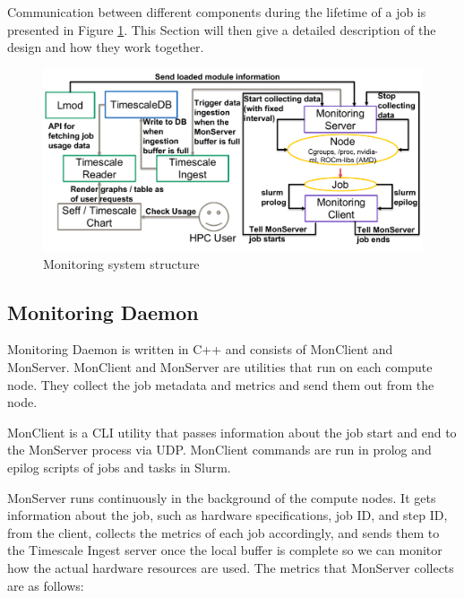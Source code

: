 
Communication between different components during the lifetime of a job is presented in Figure \ref{fig_monitoring}. This Section will then give a detailed description of the design and how they work together.

\begin{figure}[H]
    \centering
    \includegraphics[width=1\textwidth]{figures/monitoring.pdf}
    \caption{Monitoring system structure}
    \label{fig_monitoring}
\end{figure}

\subsection{Monitoring Daemon}

Monitoring Daemon is written in C++ and consists of MonClient and MonServer. MonClient and MonServer are utilities that run on each compute node. They collect the job metadata and metrics and send them out from the node.

MonClient is a CLI utility that passes information about the job start and end to the MonServer process via UDP. MonClient commands are run in prolog and epilog scripts of jobs and tasks in Slurm.

MonServer runs continuously in the background of the compute nodes. It gets information about the job, such as hardware specifications, job ID, and step ID, from the client, collects the metrics of each job accordingly, and sends them to the Timescale Ingest server once the local buffer is complete so we can monitor how the actual hardware resources are used. The metrics that MonServer collects are as follows:

